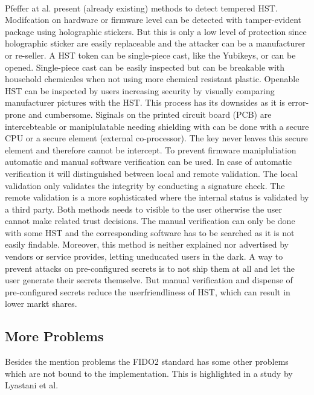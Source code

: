 \documentclass[runningheads]{llncs}
\begin{document}
\paragraph{}
Pfeffer at al. present (already existing) methods to detect tempered HST.
Modifcation on hardware or firmware level can be detected with tamper-evident package using holographic stickers. But this is only a low level of protection since holographic sticker are easily replaceable and the attacker can be a manufacturer or re-seller. A HST token can be single-piece cast, like the Yubikeys, or can be opened. Single-piece cast can be easily inspected but can be breakable with household chemicales when not using more chemical resistant plastic. Openable HST can be inspected by users increasing security by visually comparing manufacturer pictures with the HST. This process has its downsides as it is error-prone and cumbersome. Siginals on the printed circuit board (PCB) are intercebteable or maniplulatable needing shielding with can be done with a secure CPU or a secure element (external co-processor). The key never leaves this secure element and therefore cannot be intercept. To prevent firmware manipluliation automatic and manual software verification can be used. In case of automatic verification it will distinguished between local and remote validation. The local validation only validates the integrity by conducting a signature check. The remote validation is a more sophisticated where the internal status is validated by a third party. Both methods needs to visible to the user otherwise the user cannot make related trust decisions.
The manual verification can only be done with some HST and the corresponding software has to be searched as it is not easily findable. Moreover, this method is neither explained nor advertised by vendors or service provides, letting uneducated users in the dark. A way to prevent attacks on pre-configured secrets is to not ship them at all and let the user generate their secrets themselve. But manual verification and dispense of pre-configured secrets reduce the userfriendliness of HST, which can result in lower markt shares. \cite{272198}

\subsection{More Problems}
Besides the mention problems the FIDO2 standard has some other problems which are not bound to the implementation. This is highlighted in a study by Lyastani et al. \cite{9152694}
\end{document}

